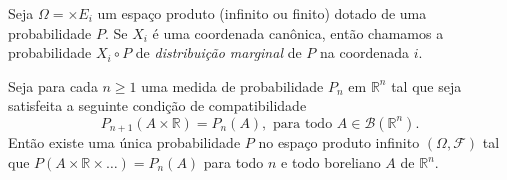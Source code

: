 \begin{definition}
  \label{d:marginal}
  Seja $\Omega = \times E_i$ um espaço produto (infinito ou finito) dotado de uma probabilidade $P$.
  Se $X_i$ é uma coordenada canônica, então chamamos a probabilidade $X_i \circ P$ de \emph{distribuição marginal}  de $P$ na coordenada $i$.
\end{definition}

\begin{theorem}
  \label{t:extens_kolmog}
  Seja para cada $n \geq 1$ uma medida de probabilidade $P_n$ em $\mathbb{R}^n$ tal que seja satisfeita a seguinte condição de compatibilidade 
  \begin{equation}
    \label{e:consist_kolmog}
    P_{n+1} (A \times \mathbb{R}) = P_n (A), \text{ para todo $A \in \mathcal{B}(\mathbb{R}^n)$}.
  \end{equation}
  Então existe uma única probabilidade $P$ no espaço produto infinito $(\Omega, \mathcal{F})$ tal que $P(A \times \mathbb{R} \times \dots) = P_n (A)$ para todo $n$ e todo boreliano $A$ de $\mathbb{R}^n$.
\end{theorem}


